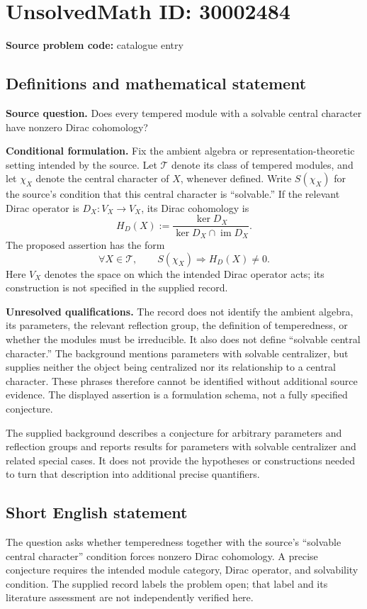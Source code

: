 \documentclass[11pt]{article}
\begin{document}
\section*{UnsolvedMath ID: 30002484}
\textbf{Source problem code:} catalogue entry
\subsection{Definitions and mathematical statement}
\textbf{Source question.} Does every tempered module with a solvable central character have nonzero Dirac cohomology?

\textbf{Conditional formulation.} Fix the ambient algebra or representation-theoretic setting intended by the source. Let \(\mathcal T\) denote its class of tempered modules, and let \(\chi_X\) denote the central character of \(X\), whenever defined. Write \(S(\chi_X)\) for the source's condition that this central character is ``solvable.'' If the relevant Dirac operator is \(D_X:V_X\to V_X\), its Dirac cohomology is
\[
H_D(X):=\frac{\ker D_X}{\ker D_X\cap\operatorname{im}D_X}.
\]
The proposed assertion has the form
\[
\forall X\in\mathcal T,\qquad S(\chi_X)\Longrightarrow H_D(X)\ne 0.
\]
Here \(V_X\) denotes the space on which the intended Dirac operator acts; its construction is not specified in the supplied record.

\textbf{Unresolved qualifications.} The record does not identify the ambient algebra, its parameters, the relevant reflection group, the definition of temperedness, or whether the modules must be irreducible. It also does not define ``solvable central character.'' The background mentions parameters with solvable centralizer, but supplies neither the object being centralized nor its relationship to a central character. These phrases therefore cannot be identified without additional source evidence. The displayed assertion is a formulation schema, not a fully specified conjecture.

The supplied background describes a conjecture for arbitrary parameters and reflection groups and reports results for parameters with solvable centralizer and related special cases. It does not provide the hypotheses or constructions needed to turn that description into additional precise quantifiers.
\subsection{Short English statement}
The question asks whether temperedness together with the source's ``solvable central character'' condition forces nonzero Dirac cohomology. A precise conjecture requires the intended module category, Dirac operator, and solvability condition. The supplied record labels the problem open; that label and its literature assessment are not independently verified here.
\end{document}
